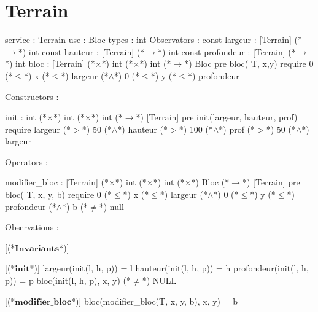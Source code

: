 \documentclass[a4paper, 11pt]{report}
\newcommand{\specB}[1]{\textbf{#1}}
\begin{document}
\section{Terrain}
\begin{Spe}
service : Terrain
use : Bloc
types : int
Observators :
	const largeur : [Terrain] (*$\rightarrow$*) int
	const hauteur : [Terrain] (*$\rightarrow$*) int
	const profondeur : [Terrain] (*$\rightarrow$*) int
	bloc : [Terrain] (*$\times$*) int (*$\times$*) int (*$\rightarrow$*) Bloc
		pre bloc( T, x,y) require 0 (*$\leq$*) x (*$\leq$*) largeur (*$\land$*) 0 (*$\leq$*) y (*$\leq$*) profondeur
	     
Constructors :

	init : int (*$\times$*) int (*$\times$*) int (*$\rightarrow$*) [Terrain]
		pre init(largeur, hauteur, prof) require largeur (*$>$*) 50 (*$\land$*) hauteur (*$>$*) 100 (*$\land$*) prof (*$>$*) 50 (*$\land$*) largeur%
	     
Operators : 

	modifier_bloc : [Terrain] (*$\times$*) int (*$\times$*) int (*$\times$*) Bloc (*$\rightarrow$*) [Terrain]
		pre bloc( T, x, y, b) require 0 (*$\leq$*) x (*$\leq$*) largeur (*$\land$*) 0 (*$\leq$*) y (*$\leq$*) profondeur (*$\land$*) b (*$\neq$*) null
	     
Observations :

      [(*$\specB{Invariants}$*)]
      
      [(*$\specB{init}$*)]
	    largeur(init(l, h, p)) = l
	    hauteur(init(l, h, p)) = h
	    profondeur(init(l, h, p)) = p
	    bloc(init(l, h, p), x, y) (*$\neq$*) NULL
	    
      [(*$\specB{modifier\_bloc}$*)]
	    bloc(modifier_bloc(T, x, y, b), x, y) = b 
	    
\end{Spe}
\end{document}

